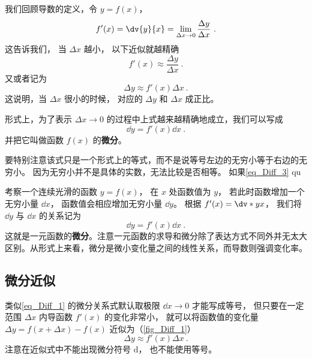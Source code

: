 
我们回顾导数的定义，令 $y = f(x)$，
\begin{equation}
f'(x) = \dv{y}{x} = \lim_{\Delta x\to 0} \frac{\Delta y}{\Delta x}~.
\end{equation}
这告诉我们， 当 $\Delta x$ 越小， 以下近似就越精确
\begin{equation}
f'(x) \approx \frac{\Delta y}{\Delta x}~.
\end{equation}
又或者记为
\begin{equation}\label{eq_Diff_3}
\Delta y \approx f'(x) \Delta x~.
\end{equation}
这说明，当 $\Delta x$ 很小的时候， 对应的 $\Delta y$ 和 $\Delta x$ 成正比。

形式上，为了表示 $\Delta x\to 0$ 的过程中上式越来越精确地成立，我们可以写成
\begin{equation}
\dd{y} = f'(x)\dd{x}~.
\end{equation}
并把它叫做函数 $f(x)$ 的\textbf{微分}。

要特别注意该式只是一个形式上的等式，而不是说等号左边的无穷小等于右边的无穷小。 因为无穷小并不是具体的实数，无法比较是否相等。 如果\autoref{eq_Diff_3} qu

考察一个连续光滑的函数 $y = f(x)$， 在 $x$ 处函数值为 $y$， 若此时函数增加一个无穷小量 $\dd{x}$， 函数值会相应增加无穷小量 $\dd{y}$。 根据 $f'(x) = \dv*{y}{x}$， 我们将 $\dd{y}$ 与 $\dd{x}$ 的关系记为
\begin{equation}\label{eq_Diff_1}
\dd{y} = f'(x) \dd{x}~.
\end{equation}
这就是一元函数的\textbf{微分}。注意一元函数的求导和微分除了表达方式不同外并无太大区别。从形式上来看，微分是微小变化量之间的线性关系，而导数则强调变化率。

\subsection{微分近似}\label{sub_Diff_1}
类似\autoref{eq_Diff_1} 的微分关系式默认取极限 $\dd{x} \to 0$ 才能写成等号， 但只要在一定范围 $\Delta x$ 内导函数 $f'(x)$ 的变化非常小， 就可以将函数值的变化量 $\Delta y = f(x+\Delta x)-f(x)$ 近似为（\autoref{fig_Diff_1}）
\begin{equation}\label{eq_Diff_2}
\Delta y \approx f'(x) \Delta x~.
\end{equation}
注意在近似式中不能出现微分符号 $\mathrm{d}$， 也不能使用等号。

